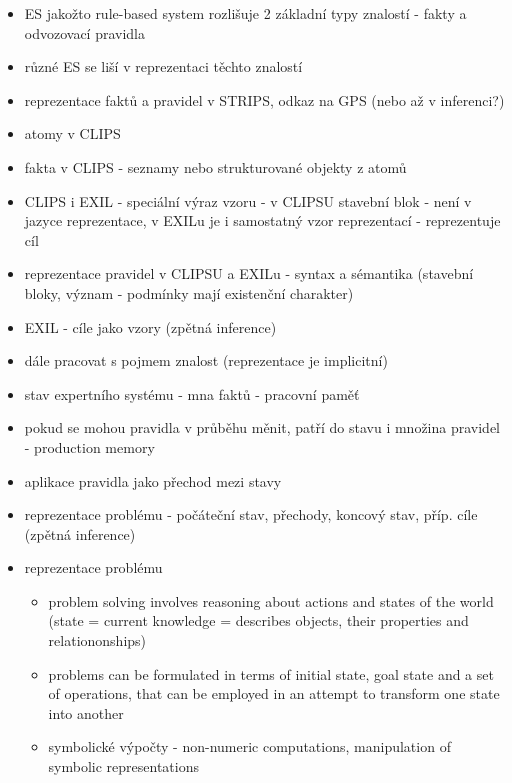 \begin{framed}
  \begin{itemize}
    \item ES jakožto rule-based system rozlišuje 2 základní typy znalostí -
      fakty a odvozovací pravidla
    \item různé ES se liší v reprezentaci těchto znalostí
    \item reprezentace faktů a pravidel v STRIPS, odkaz na GPS (nebo až v
      inferenci?)
    \item atomy v CLIPS
    \item fakta v CLIPS - seznamy nebo strukturované objekty z atomů
    \item CLIPS i EXIL - speciální výraz vzoru - v CLIPSU stavební blok - není
      v jazyce reprezentace, v EXILu je i samostatný vzor reprezentací -
      reprezentuje cíl
    \item reprezentace pravidel v CLIPSU a EXILu - syntax a sémantika
      (stavební bloky, význam - podmínky mají existenční charakter)
    \item EXIL - cíle jako vzory (zpětná inference)
    \item dále pracovat s pojmem znalost (reprezentace je implicitní)
    \item stav expertního systému - mna faktů - pracovní paměť
    \item pokud se mohou pravidla v průběhu měnit, patří do stavu i množina
      pravidel - production memory
    \item aplikace pravidla jako přechod mezi stavy
    \item reprezentace problému - počáteční stav, přechody, koncový stav,
      příp. cíle (zpětná inference)
    \item reprezentace problému
      \begin{itemize}
        \item problem solving involves reasoning about actions and states of the
          world (state = current knowledge = describes objects, their properties and
          relationonships)
        \item problems can be formulated in terms of initial state, goal state
          and a set of operations, that can be employed in an attempt to
          transform one state into another
        \item symbolické výpočty - non-numeric computations, manipulation of
          symbolic representations
      \end{itemize}
  \end{itemize}
\end{framed}
